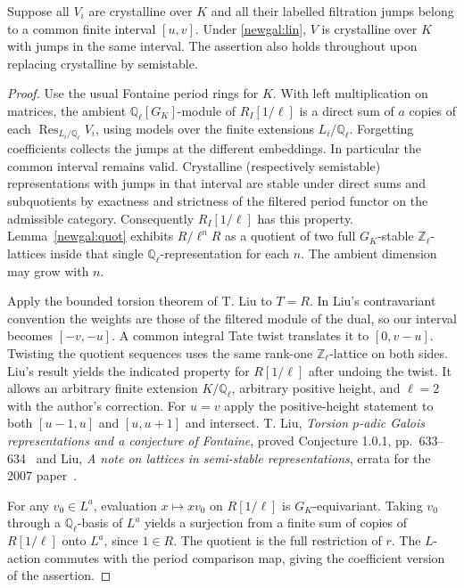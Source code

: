 \begin{theorem}\label{newgal:liu}
Suppose all $V_i$ are crystalline over $K$ and all their labelled filtration
jumps belong to a common finite interval $[u,v]$. Under \eqref{newgal:lin},
$V$ is crystalline over $K$ with jumps in the same interval.
The assertion also holds throughout upon replacing crystalline by semistable.
\end{theorem}
\begin{proof}
Use the usual Fontaine period rings for $K$. With left multiplication on
matrices, the ambient $\mathbb Q_\ell[G_K]$-module of $R_I[1/\ell]$
is a direct sum of $a$ copies of each $\operatorname{Res}_{L_i/\mathbb Q_\ell}V_i$,
using models over the finite extensions $L_i/\mathbb Q_\ell$. Forgetting coefficients collects the jumps
at the different embeddings. In particular the common interval remains valid.
Crystalline (respectively semistable) representations with jumps in that
interval are stable under direct sums and subquotients by exactness and
strictness of the filtered period functor on the admissible category.
Consequently $R_I[1/\ell]$ has this property. Lemma~\ref{newgal:quot}
exhibits $R/\ell^nR$ as a quotient of two full $G_K$-stable $\mathbb Z_\ell$-lattices
inside that single $\mathbb Q_\ell$-representation for each $n$. The ambient
dimension may grow with $n$.

Apply the bounded torsion theorem of T. Liu to $T=R$. In Liu's
contravariant convention the weights are those of the filtered module
of the dual, so our interval becomes $[-v,-u]$. A common integral Tate
twist translates it to $[0,v-u]$. Twisting the quotient sequences uses
the same rank-one $\mathbb Z_\ell$-lattice on both sides. Liu's result
yields the indicated property for $R[1/\ell]$ after undoing the twist.
It allows an arbitrary finite extension $K/\mathbb Q_\ell$, arbitrary
positive height, and $\ell=2$ with the author's correction. For $u=v$ apply
the positive-height statement to both $[u-1,u]$ and $[u,u+1]$ and intersect.
T. Liu,
\emph{Torsion $p$-adic Galois representations and a conjecture of Fontaine},
proved Conjecture 1.0.1, pp.~633--634~\cite{liuTorsion} and
Liu,
\emph{A note on lattices in semi-stable representations}, errata for the 2007 paper~\cite{liuLattices}.

For any $v_0\in L^a$, evaluation $x\mapsto xv_0$ on $R[1/\ell]$ is
$G_K$-equivariant. Taking $v_0$ through a $\mathbb Q_\ell$-basis of $L^a$
yields a surjection from a finite sum of copies of $R[1/\ell]$ onto $L^a$,
since $1\in R$. The quotient is the full restriction of $r$.
The $L$-action commutes with the period comparison map, giving the
coefficient version of the assertion.
\end{proof}

